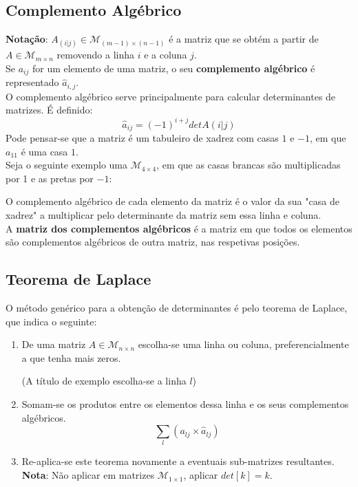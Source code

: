 \documentclass[]{report}
\begin{document}
\subsection{Complemento Algébrico}
\textbf{Notação}: $A_{(i|j)} \in \mathcal{M}_{(m-1) \times (n-1)}$ é a matriz que se obtém a partir de $A \in \mathcal{M}_{m \times n}$ removendo a linha $i$ e a coluna $j$.\\[0.5cm]
Se $a_{ij}$ for um elemento de uma matriz, o seu \textbf{complemento algébrico} é representado $\hat a_{i,j}$.\\
O complemento algébrico serve principalmente para calcular determinantes de matrizes. É definido:
$$\hat a_{ij} = (-1)^{i+j} det A(i|j)$$
Pode pensar-se que a matriz é um tabuleiro de xadrez com casas $1$ e $-1$, em que $a_{11}$ é uma casa $1$.\\
Seja o seguinte exemplo uma $\mathcal{M}_{4 \times 4}$, em que as casas brancas são multiplicadas por 1 e as pretas por $-1$:
\begin{center}
\end{center}
O complemento algébrico de cada elemento da matriz é o valor da sua "casa de xadrez" a multiplicar pelo determinante da matriz sem essa linha e coluna.\\[0.2cm]
A \textbf{matriz dos complementos algébricos} é a matriz em que todos os elementos são complementos algébricos de outra matriz, nas respetivas posições.
\subsection{Teorema de Laplace}
O método genérico para a obtenção de determinantes é pelo teorema de Laplace, que indica o seguinte:
\begin{enumerate}
\item De uma matriz $A \in \mathcal{M}_{n \times n}$ escolha-se uma linha ou coluna, preferencialmente a que tenha mais zeros.
\begin{center}(A título de exemplo escolha-se a linha $l$)\end{center}
\item Somam-se os produtos entre os elementos dessa linha e os seus complementos algébricos.
$$\sum_l \left(a_{lj} \times \hat a_{lj}\right)$$
\item Re-aplica-se este teorema novamente a eventuais sub-matrizes resultantes.\\
\textbf{Nota}: Não aplicar em matrizes $\mathcal{M}_{1\times 1}$, aplicar $det [k] = k$.
\end{enumerate}
\end{document}
